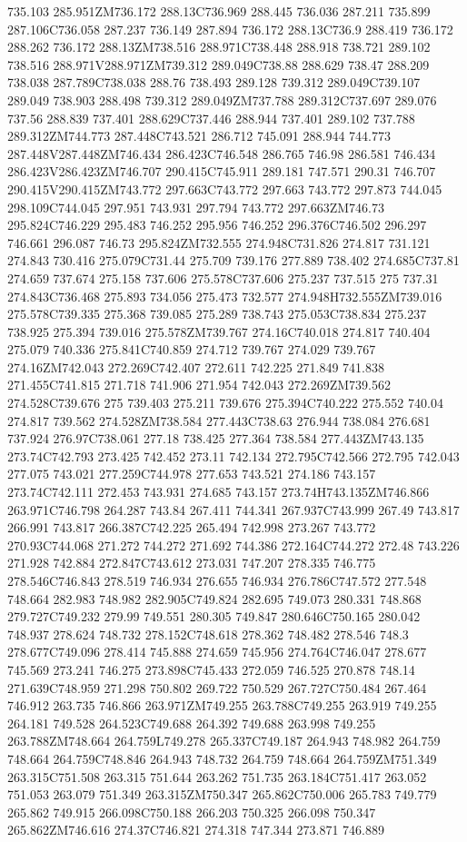 735.103 285.951ZM736.172 288.13C736.969 288.445 736.036 287.211 735.899 287.106C736.058 287.237 736.149 287.894 736.172 288.13C736.9 288.419 736.172 288.262 736.172 288.13ZM738.516 288.971C738.448 288.918 738.721 289.102 738.516 288.971V288.971ZM739.312 289.049C738.88 288.629 738.47 288.209 738.038 287.789C738.038 288.76 738.493 289.128 739.312 289.049C739.107 289.049 738.903 288.498 739.312 289.049ZM737.788 289.312C737.697 289.076 737.56 288.839 737.401 288.629C737.446 288.944 737.401 289.102 737.788 289.312ZM744.773 287.448C743.521 286.712 745.091 288.944 744.773 287.448V287.448ZM746.434 286.423C746.548 286.765 746.98 286.581 746.434 286.423V286.423ZM746.707 290.415C745.911 289.181 747.571 290.31 746.707 290.415V290.415ZM743.772 297.663C743.772 297.663 743.772 297.873 744.045 298.109C744.045 297.951 743.931 297.794 743.772 297.663ZM746.73 295.824C746.229 295.483 746.252 295.956 746.252 296.376C746.502 296.297 746.661 296.087 746.73 295.824ZM732.555 274.948C731.826 274.817 731.121 274.843 730.416 275.079C731.44 275.709 739.176 277.889 738.402 274.685C737.81 274.659 737.674 275.158 737.606 275.578C737.606 275.237 737.515 275 737.31 274.843C736.468 275.893 734.056 275.473 732.577 274.948H732.555ZM739.016 275.578C739.335 275.368 739.085 275.289 738.743 275.053C738.834 275.237 738.925 275.394 739.016 275.578ZM739.767 274.16C740.018 274.817 740.404 275.079 740.336 275.841C740.859 274.712 739.767 274.029 739.767 274.16ZM742.043 272.269C742.407 272.611 742.225 271.849 741.838 271.455C741.815 271.718 741.906 271.954 742.043 272.269ZM739.562 274.528C739.676 275 739.403 275.211 739.676 275.394C740.222 275.552 740.04 274.817 739.562 274.528ZM738.584 277.443C738.63 276.944 738.084 276.681 737.924 276.97C738.061 277.18 738.425 277.364 738.584 277.443ZM743.135 273.74C742.793 273.425 742.452 273.11 742.134 272.795C742.566 272.795 742.043 277.075 743.021 277.259C744.978 277.653 743.521 274.186 743.157 273.74C742.111 272.453 743.931 274.685 743.157 273.74H743.135ZM746.866 263.971C746.798 264.287 743.84 267.411 744.341 267.937C743.999 267.49 743.817 266.991 743.817 266.387C742.225 265.494 742.998 273.267 743.772 270.93C744.068 271.272 744.272 271.692 744.386 272.164C744.272 272.48 743.226 271.928 742.884 272.847C743.612 273.031 747.207 278.335 746.775 278.546C746.843 278.519 746.934 276.655 746.934 276.786C747.572 277.548 748.664 282.983 748.982 282.905C749.824 282.695 749.073 280.331 748.868 279.727C749.232 279.99 749.551 280.305 749.847 280.646C750.165 280.042 748.937 278.624 748.732 278.152C748.618 278.362 748.482 278.546 748.3 278.677C749.096 278.414 745.888 274.659 745.956 274.764C746.047 278.677 745.569 273.241 746.275 273.898C745.433 272.059 746.525 270.878 748.14 271.639C748.959 271.298 750.802 269.722 750.529 267.727C750.484 267.464 746.912 263.735 746.866 263.971ZM749.255 263.788C749.255 263.919 749.255 264.181 749.528 264.523C749.688 264.392 749.688 263.998 749.255 263.788ZM748.664 264.759L749.278 265.337C749.187 264.943 748.982 264.759 748.664 264.759C748.846 264.943 748.732 264.759 748.664 264.759ZM751.349 263.315C751.508 263.315 751.644 263.262 751.735 263.184C751.417 263.052 751.053 263.079 751.349 263.315ZM750.347 265.862C750.006 265.783 749.779 265.862 749.915 266.098C750.188 266.203 750.325 266.098 750.347 265.862ZM746.616 274.37C746.821 274.318 747.344 273.871 746.889 